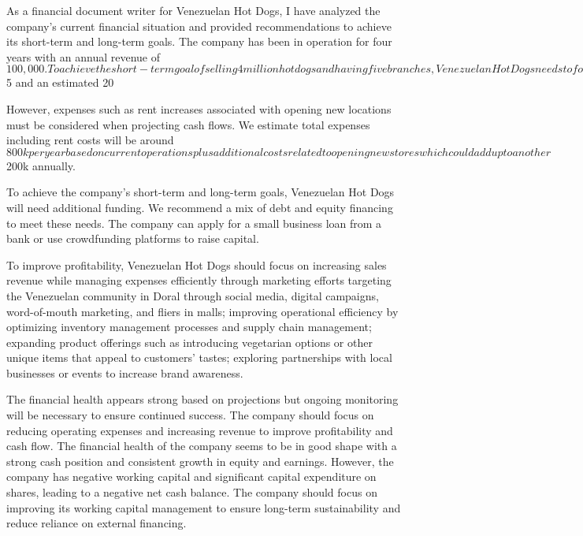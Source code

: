 As a financial document writer for Venezuelan Hot Dogs, I have analyzed the company's current financial situation and provided recommendations to achieve its short-term and long-term goals. The company has been in operation for four years with an annual revenue of $100,000. To achieve the short-term goal of selling 4 million hot dogs and having five branches, Venezuelan Hot Dogs needs to focus on increasing sales revenue while managing expenses efficiently.

Based on market analysis data provided by the company, there is high demand for their products within their target market which indicates potential growth opportunities. Assuming an average price per hot dog of $5 and an estimated 20%

However, expenses such as rent increases associated with opening new locations must be considered when projecting cash flows. We estimate total expenses including rent costs will be around $800k per year based on current operations plus additional costs related to opening new stores which could add up to another $200k annually.

To achieve the company's short-term and long-term goals, Venezuelan Hot Dogs will need additional funding. We recommend a mix of debt and equity financing to meet these needs. The company can apply for a small business loan from a bank or use crowdfunding platforms to raise capital.

To improve profitability, Venezuelan Hot Dogs should focus on increasing sales revenue while managing expenses efficiently through marketing efforts targeting the Venezuelan community in Doral through social media, digital campaigns, word-of-mouth marketing, and fliers in malls; improving operational efficiency by optimizing inventory management processes and supply chain management; expanding product offerings such as introducing vegetarian options or other unique items that appeal to customers' tastes; exploring partnerships with local businesses or events to increase brand awareness.

The financial health appears strong based on projections but ongoing monitoring will be necessary to ensure continued success. The company should focus on reducing operating expenses and increasing revenue to improve profitability and cash flow. The financial health of the company seems to be in good shape with a strong cash position and consistent growth in equity and earnings. However, the company has negative working capital and significant capital expenditure on shares, leading to a negative net cash balance. The company should focus on improving its working capital management to ensure long-term sustainability and reduce reliance on external financing.

